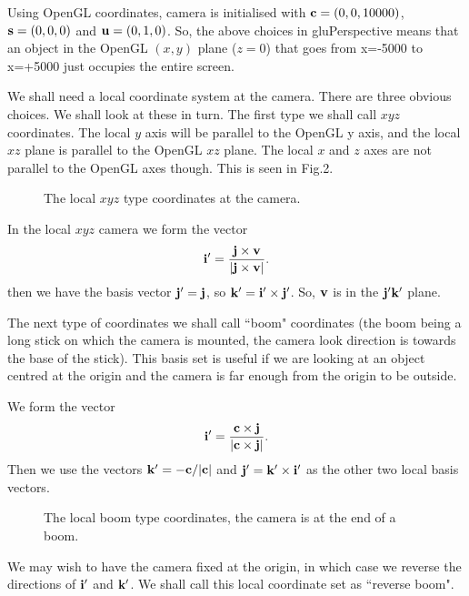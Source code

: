 \documentclass[12pt]{article}
\begin{document}
Using OpenGL coordinates,  camera is initialised with 
${\bf c}=(0, 0, 10000)$, ${\bf s}=(0, 0, 0)$ and
${\bf u}=(0,1,0)$. So, the above  choices in gluPerspective
means that an object in the OpenGL $(x,y)$ plane ($z=0$)
that goes from x=-5000 to x=+5000 just occupies the entire
 screen.

We shall need a local coordinate system at the camera. There are three
obvious choices. We shall look at these in turn. The first type
we shall call $xyz$ coordinates. The local $y$ axis will be parallel to the
OpenGL y axis, and the local $xz$ plane is parallel to the OpenGL $xz$ plane.
The local $x$ and $z$ axes are not parallel to the OpenGL axes though.
This is seen in Fig.2.
\begin{figure}[htb]
\vspace*{10cm}
\caption{ 
The local $xyz$ type coordinates at the camera.
}
\end{figure}
In the local $xyz$ camera we form the vector
\begin{equation}
{\bf i}^\prime=\frac{{\bf j} \times {\bf v}}
                     {\vert {\bf j} \times {\bf v} \vert }.
\end{equation}
then we have  the basis vector ${\bf j}^\prime=\bf j$, so
${\bf k}^\prime={\bf i}^\prime \times {\bf j}^\prime$. So, 
${\bf v}$ is in the $\bf j^\prime  k^\prime$ plane.

The next type of coordinates we shall call ``boom" coordinates
(the boom being a long stick on which the camera is mounted,
the camera look direction is towards the base of the stick).
This basis set is useful if we are looking at an object
centred at the origin and the camera is far enough
from the origin to be outside.

We form the vector 
\begin{equation}
{\bf i}^\prime=\frac{{\bf c} \times {\bf j}}
                     {\vert {\bf c} \times {\bf j} \vert }.
\end{equation}
Then we use the vectors ${\bf k}^\prime=-{\bf c} / \vert {\bf c} \vert$ and
 ${\bf j}^\prime={\bf k}^\prime \times {\bf i}^\prime$ as the other two
local basis vectors.
\begin{figure}[htb]
\vspace*{10cm}
\caption{ 
The local boom type coordinates,  the camera is  at the end of a boom.
}
\end{figure}
We may wish to have the camera fixed at the origin, in which case 
we reverse the directions of ${\bf i}^\prime$ and ${\bf k}^\prime$.
We shall call this local coordinate set as ``reverse boom".
\end{document}
